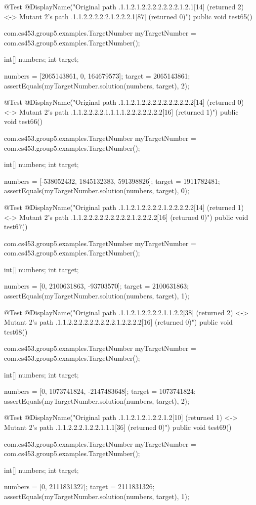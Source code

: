 @Test
@DisplayName("Original path .1.1.2.1.2.2.2.2.2.2.2.1.2.1[14] (returned 2) <-> Mutant 2's path .1.1.2.2.2.2.2.1.2.2.2.1[87] (returned 0)")
public void test65() {
    com.cs453.group5.examples.TargetNumber myTargetNumber = com.cs453.group5.examples.TargetNumber();

    int[] numbers;
    int target;

    numbers = [2065143861, 0, 164679573];
    target = 2065143861;
    assertEquals(myTargetNumber.solution(numbers, target), 2);
}

@Test
@DisplayName("Original path .1.1.2.1.2.2.2.2.2.2.2.2.2.2[14] (returned 0) <-> Mutant 2's path .1.1.2.2.2.2.1.1.1.1.2.2.2.2.2.2.2[16] (returned 1)")
public void test66() {
    com.cs453.group5.examples.TargetNumber myTargetNumber = com.cs453.group5.examples.TargetNumber();

    int[] numbers;
    int target;

    numbers = [-538052432, 1845132383, 591398826];
    target = 1911782481;
    assertEquals(myTargetNumber.solution(numbers, target), 0);
}

@Test
@DisplayName("Original path .1.1.2.1.2.2.2.2.1.2.2.2.2.2[14] (returned 1) <-> Mutant 2's path .1.1.2.2.2.2.2.2.2.2.2.1.2.2.2.2[16] (returned 0)")
public void test67() {
    com.cs453.group5.examples.TargetNumber myTargetNumber = com.cs453.group5.examples.TargetNumber();

    int[] numbers;
    int target;

    numbers = [0, 2100631863, -93703570];
    target = 2100631863;
    assertEquals(myTargetNumber.solution(numbers, target), 1);
}

@Test
@DisplayName("Original path .1.1.2.1.2.2.2.2.1.1.2.2[38] (returned 2) <-> Mutant 2's path .1.1.2.2.2.2.2.2.2.2.2.1.2.2.2.2[16] (returned 0)")
public void test68() {
    com.cs453.group5.examples.TargetNumber myTargetNumber = com.cs453.group5.examples.TargetNumber();

    int[] numbers;
    int target;

    numbers = [0, 1073741824, -2147483648];
    target = 1073741824;
    assertEquals(myTargetNumber.solution(numbers, target), 2);
}

@Test
@DisplayName("Original path .1.1.2.1.2.1.2.2.1.2[10] (returned 1) <-> Mutant 2's path .1.1.2.2.2.1.2.2.1.1.1[36] (returned 0)")
public void test69() {
    com.cs453.group5.examples.TargetNumber myTargetNumber = com.cs453.group5.examples.TargetNumber();

    int[] numbers;
    int target;

    numbers = [0, 2111831327];
    target = 2111831326;
    assertEquals(myTargetNumber.solution(numbers, target), 1);
}

